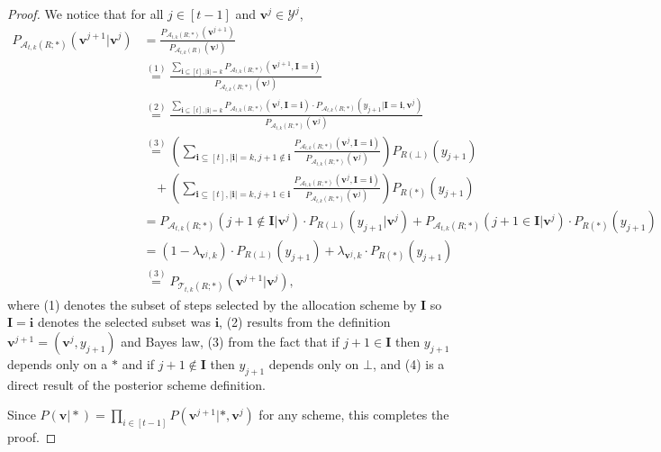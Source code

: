 \documentclass{article}
\theoremstyle{plain}
\theoremstyle{definition}
\newcommand{\eqExp}[2]{\overset{(#1)}{#2}}
\newcommand{\out}{y}
\newcommand{\outDom}{\mathcal{Y}}
\newcommand{\rand}{R}
\newcommand{\view}{\boldsymbol{v}}
\newcommand{\alloc}[2]{\mathcal{A}_{#1}\left(#2\right)}
\newcommand{\allocFunc}[3]{\mathcal{A}_{#1}\left(#2; #3\right)}
\newcommand{\postFunc}[3]{\mathcal{T}_{#1}\left(#2; #3\right)}
\begin{document}
\begin{proof}
    We notice that for all $j \in [t-1]$ and $\view^{j} \in \outDom^{j}$, 
    \begin{align*}
        P_{\allocFunc{t, k}{\rand}{*}}(\view^{j+1} \vert \view^{j}) & = \frac{P_{\allocFunc{t, k}{\rand}{*}}(\view^{j+1})}{P_{\alloc{t, k}{\rand}}(\view^{j})}
        \\ & \eqExp{1}{=} \frac{\underset{\boldsymbol{i} \subseteq [t], \vert \boldsymbol{i} \vert = k}{\sum} P_{\allocFunc{t, k}{\rand}{*}}(\view^{j+1}, \boldsymbol{I} = \boldsymbol{i})}{P_{\allocFunc{t, k}{\rand}{*}}(\view^{j})}
        \\ & \eqExp{2}{=} \frac{\underset{\boldsymbol{i} \subseteq [t], \vert \boldsymbol{i} \vert = k}{\sum} P_{\allocFunc{t, k}{\rand}{*}}(\view^{j}, \boldsymbol{I} = \boldsymbol{i}) \cdot P_{\allocFunc{t, k}{\rand}{*}}(\out_{j+1} \vert \boldsymbol{I} = \boldsymbol{i}, \view^{j})}{P_{\allocFunc{t, k}{\rand}{*}}(\view^{j})}
        \\ & \eqExp{3}{=} \left(\underset{\boldsymbol{i} \subseteq [t], \vert \boldsymbol{i} \vert = k, j+1 \notin \boldsymbol{i}}{\sum} \frac{P_{\allocFunc{t, k}{\rand}{*}}(\view^{j}, \boldsymbol{I} = \boldsymbol{i})}{P_{\allocFunc{t, k}{\rand}{*}}(\view^{j})} \right) P_{\rand(\bot)}(\out_{j+1})
        \\ & ~~~~ + \left(\underset{\boldsymbol{i} \subseteq [t], \vert \boldsymbol{i} \vert = k, j+1 \in \boldsymbol{i}}{\sum} \frac{P_{\allocFunc{t, k}{\rand}{*}}(\view^{j}, \boldsymbol{I} = \boldsymbol{i})}{P_{\allocFunc{t, k}{\rand}{*}}(\view^{j})} \right) P_{\rand(*)}(\out_{j+1})
        \\ & = P_{\allocFunc{t, k}{\rand}{*}}(j+1 \notin \boldsymbol{I} \vert \view^{j}) \cdot P_{\rand(\bot)}(\out_{j+1} \vert \view^{j}) + P_{\allocFunc{t, k}{\rand}{*}}(j+1 \in \boldsymbol{I} \vert \view^{j}) \cdot P_{\rand(*)}(\out_{j+1})
        \\ & = (1-\lambda_{\view^{j}, k}) \cdot P_{\rand(\bot)}(\out_{j+1}) + \lambda_{\view^{j}, k} \cdot P_{\rand(*)}(\out_{j+1})
        \\ & \eqExp{3}{=}  P_{\postFunc{t, k}{\rand}{*}}(\view^{j+1} \vert \view^{j}), 
    \end{align*}
    where (1) denotes the subset of steps selected by the allocation scheme by $\boldsymbol{I}$ so $\boldsymbol{I} = \boldsymbol{i}$ denotes the selected subset was $\boldsymbol{i}$, (2) results from the definition $\view^{j+1} = (\view^{j}, \out_{j+1})$ and Bayes law, (3) from the fact that if $j+1 \in \boldsymbol{I}$ then $\out_{j+1}$ depends only on a $*$ and if $j+1 \notin \boldsymbol{I}$ then $\out_{j+1}$ depends only on $\bot$, and (4) is a direct result of the posterior scheme definition.

    Since $P(\view \vert *) = \prod_{i\in[t-1]} P(\view^{j+1} \vert *, \view^{j})$ for any scheme, this completes the proof. 
\end{proof}
\end{document}
